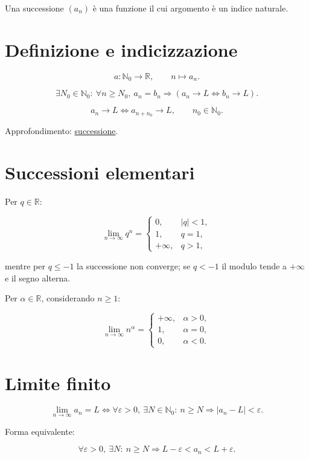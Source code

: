 Una successione \((a_n)\) è una funzione il cui argomento è un indice naturale.

\section{Definizione e indicizzazione}\label{definizione-e-indicizzazione}

\[
a:\mathbb N_0\to\mathbb R,
\qquad
n\mapsto a_n.
\]

\[
\exists N_0\in\mathbb N_0:\
\forall n\ge N_0,\ a_n=b_n
\Longrightarrow
\left(a_n\to L\Longleftrightarrow b_n\to L\right).
\]

\[
a_n\to L
\Longleftrightarrow
a_{n+n_0}\to L,
\qquad n_0\in\mathbb N_0.
\]

Approfondimento: \href{https://ingegnerismo.it/matematica/successione/}{successione}.

\section{Successioni elementari}\label{successioni-elementari}

Per \(q\in\mathbb R\):

\[
\lim_{n\to\infty}q^n=
\begin{cases}
0,&|q|<1,\\
1,&q=1,\\
+\infty,&q>1,
\end{cases}
\]

mentre per \(q\le-1\) la successione non converge; se \(q<-1\) il modulo tende a \(+\infty\) e il segno alterna.

Per \(\alpha\in\mathbb R\), considerando \(n\ge1\):

\[
\lim_{n\to\infty}n^\alpha=
\begin{cases}
+\infty,&\alpha>0,\\
1,&\alpha=0,\\
0,&\alpha<0.
\end{cases}
\]

\section{Limite finito}\label{limite-finito}

\[
\lim_{n\to\infty}a_n=L
\Longleftrightarrow
\forall\varepsilon>0,\ \exists N\in\mathbb N_0:\
n\ge N\Rightarrow |a_n-L|<\varepsilon.
\]

Forma equivalente:

\[
\forall\varepsilon>0,\ \exists N:\
n\ge N\Rightarrow L-\varepsilon<a_n<L+\varepsilon.
\]

